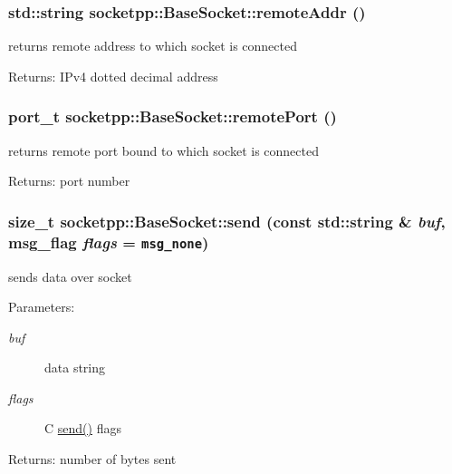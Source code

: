 \begin{CompactItemize}
{\subsubsection[{remoteAddr}]{\setlength{\rightskip}{0pt plus 5cm}std::string socketpp::BaseSocket::remoteAddr ()}}
\label{classsocketpp_1_1BaseSocket_483c6186ae60d0c399983e14f55af600}


returns remote address to which socket is connected 

\begin{Desc}
\item[Returns:]IPv4 dotted decimal address \end{Desc}
\hypertarget{classsocketpp_1_1BaseSocket_039db642444d2111f2f58ebe032c5f5f}{
\subsubsection[{remotePort}]{\setlength{\rightskip}{0pt plus 5cm}port\_\-t socketpp::BaseSocket::remotePort ()}}
\label{classsocketpp_1_1BaseSocket_039db642444d2111f2f58ebe032c5f5f}


returns remote port bound to which socket is connected 

\begin{Desc}
\item[Returns:]port number \end{Desc}
\hypertarget{classsocketpp_1_1BaseSocket_8a5fa7a9374964d7978285a003301b9d}{
\subsubsection[{send}]{\setlength{\rightskip}{0pt plus 5cm}size\_\-t socketpp::BaseSocket::send (const std::string \& {\em buf}, \/  msg\_\-flag {\em flags} = {\tt msg\_\-none})}}
\label{classsocketpp_1_1BaseSocket_8a5fa7a9374964d7978285a003301b9d}


sends data over socket 

\begin{Desc}
\item[Parameters:]
\begin{description}
\item[{\em buf}]data string \item[{\em flags}]C \hyperlink{classsocketpp_1_1BaseSocket_a63e58c917c6be09f641f9ff1830e74a}{send()} flags \end{description}
\end{Desc}
\begin{Desc}
\item[Returns:]number of bytes sent \end{Desc}
\hypertarget{classsocketpp_1_1BaseSocket_a63e58c917c6be09f641f9ff1830e74a}{
}
\end{CompactItemize}
